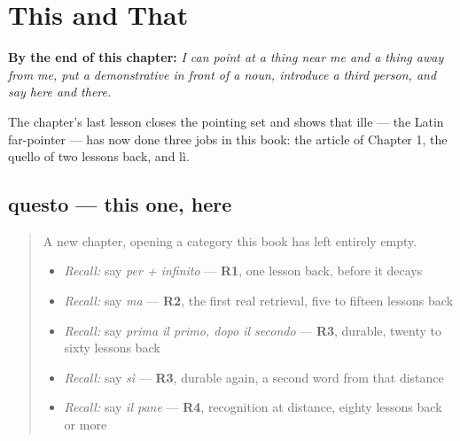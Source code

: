 
\chapter{This and That}
\label{ch:it-questo-quello}

\begin{chapteropening}
\textbf{By the end of this chapter:} \emph{I can point at a thing near me and a thing away from me, put a demonstrative in front of a noun, introduce a third person, and say here and there.}

The chapter's last lesson closes the pointing set and shows that ille — the Latin far-pointer — has now done three jobs in this book: the article of Chapter 1, the quello of two lessons back, and lì.
\end{chapteropening}

\section[questo]{questo — this one, here}

\label{lesson:IT-C33-questo}



\begin{quote}
A new chapter, opening a category this book has left entirely empty.

\begin{itemize}
\raggedright
  \item \emph{Recall:} say \emph{per + infinito} — \textbf{R1}, one lesson back, before it decays
  \item \emph{Recall:} say \emph{ma} — \textbf{R2}, the first real retrieval, five to fifteen lessons back
  \item \emph{Recall:} say \emph{prima il primo, dopo il secondo} — \textbf{R3}, durable, twenty to sixty lessons back
  \item \emph{Recall:} say \emph{sì} — \textbf{R3}, durable again, a second word from that distance
  \item \emph{Recall:} say \emph{il pane} — \textbf{R4}, recognition at distance, eighty lessons back or more
\end{itemize}
\end{quote}

